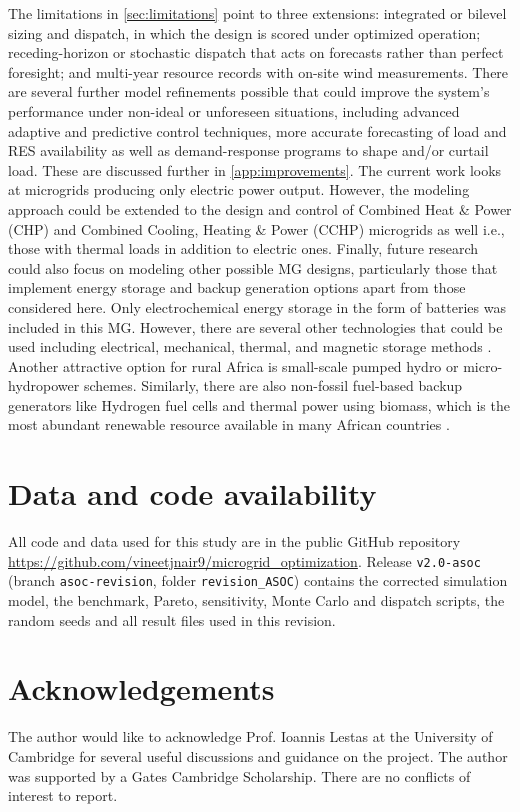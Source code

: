 \documentclass[final,3p,times]{elsarticle}
\begin{document}
The limitations in \cref{sec:limitations} point to three extensions: integrated or bilevel sizing and dispatch, in which the design is scored under optimized operation; receding-horizon or stochastic dispatch that acts on forecasts rather than perfect foresight; and multi-year resource records with on-site wind measurements. There are several further model refinements possible that could improve the system's performance under non-ideal or unforeseen situations, including advanced adaptive and predictive control techniques, more accurate forecasting of load and RES availability as well as demand-response programs to shape and/or curtail load. These are discussed further in \cref{app:improvements}. The current work looks at microgrids producing only electric power output. However, the modeling approach could be extended to the design and control of Combined Heat \& Power (CHP) and Combined Cooling, Heating \& Power (CCHP) microgrids as well i.e., those with thermal loads in addition to electric ones. Finally, future research could also focus on modeling other possible MG designs, particularly those that implement energy storage and backup generation options apart from those considered here. Only electrochemical energy storage in the form of batteries was included in this MG. However, there are several other technologies that could be used including electrical, mechanical, thermal, and magnetic storage methods \cite{ESS_control}. Another attractive option for rural Africa is small-scale pumped hydro or micro-hydropower schemes. Similarly, there are also non-fossil fuel-based backup generators like Hydrogen fuel cells and thermal power using biomass, which is the most abundant renewable resource available in many African countries \cite{usea}.

\section{Data and code availability}

All code and data used for this study are in the public GitHub repository \url{https://github.com/vineetjnair9/microgrid_optimization}. Release \texttt{v2.0-asoc} (branch \texttt{asoc-revision}, folder \texttt{revision\_ASOC}) contains the corrected simulation model, the benchmark, Pareto, sensitivity, Monte Carlo and dispatch scripts, the random seeds and all result files used in this revision.

\section{Acknowledgements}
The author would like to acknowledge Prof. Ioannis Lestas at the University of Cambridge for several useful discussions and guidance on the project. The author was supported by a Gates Cambridge Scholarship. There are no conflicts of interest to report.
\end{document}
